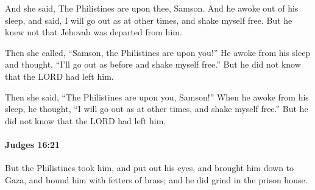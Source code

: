 			\begin{versebox}
					\item[BHS] 
					\item[ASV] And she said, The Philistines are upon thee, Samson. And he awoke out of his sleep, and said, I will go out as at other times, and shake myself free. But he knew not that Jehovah was departed from him.
					\item[NIV] Then she called, “Samson, the Philistines are upon you!” He awoke from his sleep and thought, “I’ll go out as before and shake myself free.” But he did not know that the LORD had left him.
					\item[NRSV] Then she said, “The Philistines are upon you, Samson!” When he awoke from his sleep, he thought, “I will go out as at other times, and shake myself free.” But he did not know that the LORD had left him.
			\end{versebox}

		\paragraph{Judges 16:21} %
			\label{JUDGES-16-21}

			But the Philistines took him, and put out his eyes, and brought him down to Gaza, and bound him with fetters of brass; and he did grind in the prison house.

